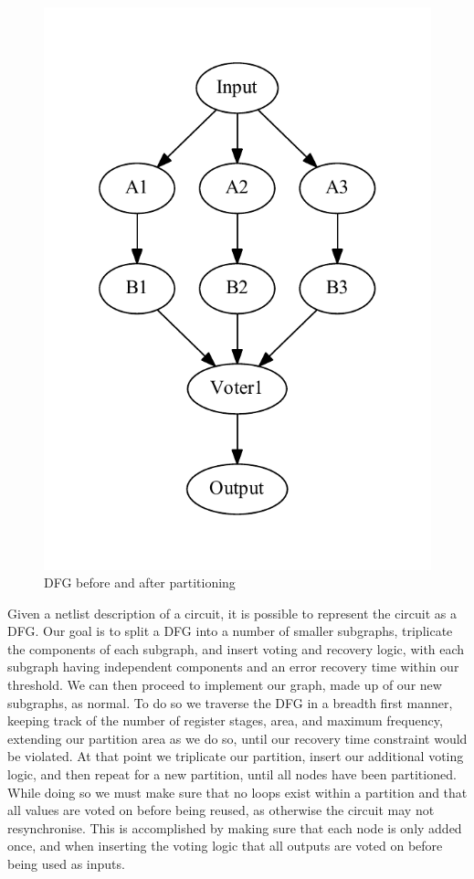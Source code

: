 \documentclass[12pt,final,oneside]{dwThesis} %
\begin{document}
\begin{figure}
\begin{center}
        \includegraphics[height=0.2\textheight]{images/TMR-post.pdf}
        \caption{\ac{DFG} before and after partitioning}
        \label{TMRFigure}
    \end{center}
\end{figure}
Given a netlist description of a circuit, it is possible to represent the circuit as a \ac{DFG}\cite{FPGAArch}. Our goal is to split a \ac{DFG} into a number of smaller subgraphs, triplicate the components of each subgraph, and insert voting and recovery logic, with each subgraph having independent components and an error recovery time within our threshold. We can then proceed to implement our graph, made up of our new subgraphs, as normal.
To do so we traverse the \ac{DFG} in a breadth first manner, keeping track of the number of register stages, area, and maximum frequency, extending our partition area as we do so, until our recovery time constraint would be violated. At that point we triplicate our partition, insert our additional voting logic, and then repeat for a new partition, until all nodes have been partitioned.  While doing so we must make sure that no loops exist within a partition and that all values are voted on before being reused, as otherwise the circuit may not resynchronise. This is accomplished by making sure that each node is only added once, and when inserting the voting logic that all outputs are voted on before being used as inputs.
\end{document}
